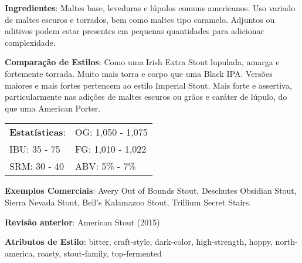 \textbf{Ingredientes}: Maltes base, leveduras e lúpulos comuns americanos. Uso variado de maltes escuros e torrados, bem como maltes tipo caramelo. Adjuntos ou aditivos podem estar presentes em pequenas quantidades para adicionar complexidade.

\textbf{Comparação de Estilos}: Como uma Irish Extra Stout lupulada, amarga e fortemente torrada. Muito mais torra e corpo que uma Black IPA. Versões maiores e mais fortes pertencem ao estilo Imperial Stout. Mais forte e assertiva, particularmente nas adições de maltes escuros ou grãos e caráter de lúpulo, do que uma American Porter.

\begin{tabular}{@{}p{35mm}p{35mm}@{}}
  \textbf{Estatísticas}: & OG: 1,050 - 1,075 \\
  IBU: 35 - 75  & FG: 1,010 - 1,022 \\
  SRM: 30 - 40  & ABV: 5\% - 7\%
\end{tabular}

\textbf{Exemplos Comerciais}: Avery Out of Bounds Stout, Deschutes Obsidian Stout, Sierra Nevada Stout, Bell’s Kalamazoo Stout, Trillium Secret Stairs.

\textbf{Revisão anterior}: American Stout (2015)

\textbf{Atributos de Estilo}: bitter, craft-style, dark-color, high-strength, hoppy, north-america, roasty, stout-family, top-fermented
